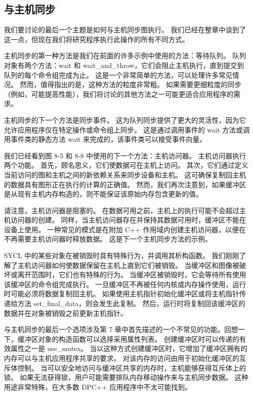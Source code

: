 \subsection{与主机同步}
我们要讨论的最后一个主题是如何与主机同步图执行。 我们已经在整章中谈到了这一点，但现在我们将研究程序执行此操作的所有不同方式。

主机同步的第一种方法是我们在前面的许多示例中使用的方法：等待队列。 队列对象有两个方法：wait 和 wait\_and\_throw，它们会阻止主机执行，直到提交到队列的每个命令组完成为止。 这是一个非常简单的方法，可以处理许多常见情况。 然而，值得指出的是，这种方法的粒度非常粗。 如果需要更细粒度的同步（例如，可能提高性能），我们将讨论的其他方法之一可能更适合应用程序的需求。

主机同步的下一个方法是同步事件。 这为队列同步提供了更大的灵活性，因为它允许应用程序仅在特定操作或命令组上同步。 这是通过调用事件的 wait 方法或调用事件类的静态方法 wait 来完成的，该事件类可以接受事件向量。

我们已经看到图 8-5 和 8-8 中使用的下一个方法：主机访问器。 主机访问器执行两个功能。 首先，顾名思义，它们使数据可在主机上访问。 其次，它们通过定义当前访问的图和主机之间的新依赖关系来同步设备和主机。 这可确保复制回主机的数据具有图形正在执行的计算的正确值。 然而，我们再次注意到，如果缓冲区是从现有主机内存构造的，则不能保证该原始内存包含更新的值。

请注意，主机访问器是阻塞的。 在数据可用之前，主机上的执行可能不会超过主机访问器的创建。 同样，当主机访问器存在并保持其数据可用时，缓冲区不能在设备上使用。 一种常见的模式是在附加 C++ 作用域内创建主机访问器，以便在不再需要主机访问器时释放数据。 这是下一个主机同步方法的示例。

SYCL 中的某些对象在被销毁时具有特殊行为，并调用其析构函数。 我们刚刚了解了主机访问器如何使数据保留在主机上直到它们被销毁。 当缓冲区和图像被破坏或离开范围时，它们也有特殊的行为。 当缓冲区被销毁时，它会等待所有使用该缓冲区的命令组完成执行。 一旦缓冲区不再被任何内核或内存操作使用，运行时可能必须将数据复制回主机。 如果使用主机指针初始化缓冲区或将主机指针传递给方法 set\_final\_data，则会发生此复制。 然后，运行时将复制回该缓冲区的数据并在对象被销毁之前更新主机指针。

与主机同步的最后一个选项涉及第 7 章中首先描述的一个不常见的功能。回想一下，缓冲区对象的构造函数可以选择采用属性列表。 创建缓冲区时可以传递的有效属性之一是 use\_mutex。 当以这种方式创建缓冲区时，它增加了缓冲区拥有的内存可以与主机应用程序共享的要求。 对该内存的访问由用于初始化缓冲区的互斥体控制。 当可以安全地访问与缓冲区共享的内存时，主机能够获得互斥体上的锁。 如果无法获得锁，用户可能需要排队内存移动操作来与主机同步数据。 这种用途非常特殊，在大多数 DPC++ 应用程序中不太可能找到。

